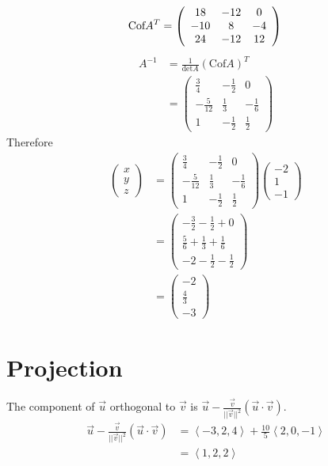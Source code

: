 \documentclass[10pt,twocolumn,twoside,a4paper]{article}
\begin{document}
\[
\text{Cof}A^T=\left(
\begin{array}{ccc}
18&-12&0\\
-10&8&-4\\
24&-12&12
\end{array}
\right)\\
\]
\begin{align*}
A^{-1}&=\frac{1}{\text{det}A}(\text{Cof}A)^T\\
&=\left(
\begin{array}{ccc}
\frac{3}{4}&-\frac{1}{2}&0\\
-\frac{5}{12}&\frac{1}{3}&-\frac{1}{6}\\
1&-\frac{1}{2}&\frac{1}{2}
\end{array}
\right)
\end{align*}
Therefore 
\begin{align*}
\left(
\begin{array}{c}
x\\
y\\
z
\end{array}
\right)&=\left(
\begin{array}{ccc}
\frac{3}{4}&-\frac{1}{2}&0\\
-\frac{5}{12}&\frac{1}{3}&-\frac{1}{6}\\
1&-\frac{1}{2}&\frac{1}{2}
\end{array}
\right)\left(
\begin{array}{c}
-2\\
1\\
-1
\end{array}
\right)\\
&=\left(
\begin{array}{c}
-\frac{3}{2}-\frac{1}{2}+0\\
\frac{5}{6}+\frac{1}{3}+\frac{1}{6}\\
-2-\frac{1}{2}-\frac{1}{2}
\end{array}
\right)\\
&=\left(
\begin{array}{c}
-2\\
\frac{4}{3}\\
-3
\end{array}
\right)
\end{align*}
\section*{Projection}
The component of $\vec{u}$ orthogonal to $\vec{v}$ is $\vec{u}-\frac{\vec{v}}{||\vec{v}||^2}(\vec{u}\cdot\vec{v})$.
\begin{align*}
\vec{u}-\frac{\vec{v}}{||\vec{v}||^2}(\vec{u}\cdot\vec{v})&=\left\langle-3,2,4\right\rangle+\frac{10}{5}\left\langle2,0,-1\right\rangle\\
&=\left\langle1,2,2\right\rangle
\end{align*}
\end{document}
